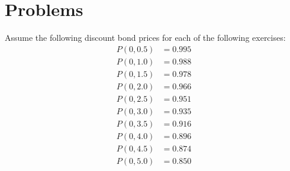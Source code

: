 \section*{Problems}
Assume the following discount bond prices for each of the following exercises:
\begin{align*}
P(0,0.5) & = 0.995\\
P(0,1.0) & = 0.988\\
P(0,1.5) & = 0.978\\
P(0,2.0) & = 0.966\\
P(0,2.5) & = 0.951\\
P(0,3.0) & = 0.935\\
P(0,3.5) & = 0.916\\
P(0,4.0) & = 0.896\\
P(0,4.5) & = 0.874\\
P(0,5.0) & = 0.850
\end{align*}
